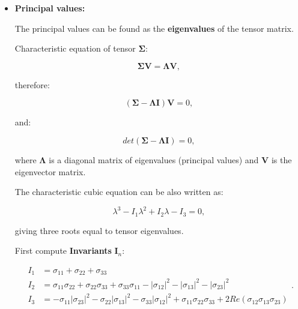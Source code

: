 \begin{itemize}
    \item \textbf{Principal values:}

        The principal values can be found as the \textbf{eigenvalues} of the tensor
        matrix.

        Characteristic equation of tensor $\mathbf{\Sigma}$:

        \begin{equation}
            \mathbf{\Sigma}\mathbf{V} = \mathbf{\Lambda} \mathbf{V}
        ,\end{equation}

        therefore:

        \begin{equation}
            (\mathbf{\Sigma} - \mathbf{\Lambda}\mathbf{I})\mathbf{V} = 0
        ,\end{equation}

        and:

        \begin{equation}
            det(\mathbf{\Sigma} - \mathbf{\Lambda}\mathbf{I}) = 0
        ,\end{equation}

        where $\mathbf{\Lambda}$ is a diagonal matrix of eigenvalues (principal values)
        and $\mathbf{V}$ is the eigenvector matrix.

        The characteristic cubic equation can be also written as:

        \begin{equation}
            \lambda^{3} - I_{1}\lambda^{2} + I_{2}\lambda - I_{3} = 0
            \label{eqn:cubic_cardano}
        ,\end{equation}

        giving three roots equal to tensor eigenvalues.

        First compute \textbf{Invariants} $\mathbf{I}_{n}$:

        \begin{equation}
            \begin{array}{ll}
                I_{1} &= \sigma_{11} + \sigma_{22} + \sigma_{33} \\
                I_{2} &= \sigma_{11}\sigma_{22} + \sigma_{22}\sigma_{33} + \sigma_{33}\sigma_{11}
                - \left|\sigma_{12}\right|^{2}
                - \left|\sigma_{13}\right|^{2}
                - \left|\sigma_{23}\right|^{2} \\
                I_{3}
                &=
                - \sigma_{11}\left|\sigma_{23}\right|^{2}
                - \sigma_{22}\left|\sigma_{13}\right|^{2}
                - \sigma_{33}\left|\sigma_{12}\right|^{2}
                + \sigma_{11}\sigma_{22}\sigma_{33}
                + 2Re\left(\sigma_{12}\sigma_{13}\sigma_{23}\right)
            \end{array}
        .\end{equation}


\end{itemize}
